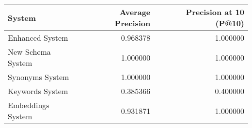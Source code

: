 \begin{tabular}{lrr}
\toprule
System & Average Precision & Precision at 10 (P@10) \\
\midrule
Enhanced System & 0.968378 & 1.000000 \\
New Schema System & 1.000000 & 1.000000 \\
Synonyms System & 1.000000 & 1.000000 \\
Keywords System & 0.385366 & 0.400000 \\
Embeddings System & 0.931871 & 1.000000 \\
\bottomrule
\end{tabular}
